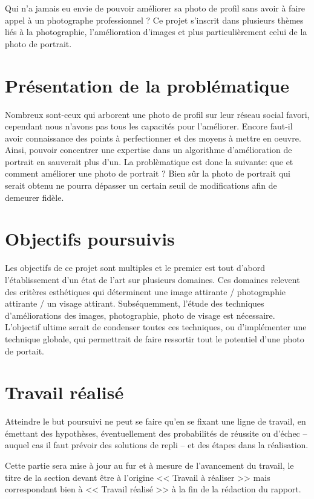 \documentclass[11pt, french]{report-rd-info}
\begin{document}
Qui n'a jamais eu envie de pouvoir améliorer sa photo de profil sans avoir à faire appel à un photographe professionnel ? Ce projet s'inscrit dans plusieurs thèmes liés à la photographie, l'amélioration d'images et plus particulièrement celui de la photo de portrait.

\section{Présentation de la problématique}

Nombreux sont-ceux qui arborent une photo de profil sur leur réseau social favori, cependant nous n'avons pas tous les capacités pour l'améliorer. Encore faut-il avoir connaissance des points à perfectionner et des moyens à mettre en oeuvre. 
Ainsi, pouvoir concentrer une expertise dans un algorithme d'amélioration de portrait en sauverait plus d'un. La problèmatique est donc la suivante: que et comment améliorer une photo de portrait ? Bien sûr la photo de portrait qui serait obtenu ne pourra dépasser un certain seuil de modifications afin de demeurer fidèle.

\section{Objectifs poursuivis}

Les objectifs de ce projet sont multiples et le premier est tout d'abord l'établissement d'un état de l'art sur plusieurs domaines. Ces domaines relevent des critères esthétiques qui déterminent une image attirante / photographie attirante / un visage attirant. Subséquemment, l'étude des techniques d'améliorations des images, photographie, photo de visage est nécessaire. L'objectif ultime serait de condenser toutes ces techniques, ou d'implémenter une technique globale, qui permettrait de faire ressortir tout le potentiel d'une photo de portait. 


\section{Travail réalisé}

Atteindre le but poursuivi ne peut se faire qu'en se fixant une ligne de travail, en émettant des hypothèses, éventuellement des probabilités de réussite ou d'échec -- auquel cas il faut prévoir des solutions de repli -- et des étapes dans la réalisation.

Cette partie sera mise à jour au fur et à mesure de l'avancement du travail, le titre de la section devant être à l'origine << Travail à réaliser >> mais correspondant bien à << Travail réalisé >> à la fin de la rédaction du rapport.
\end{document}
